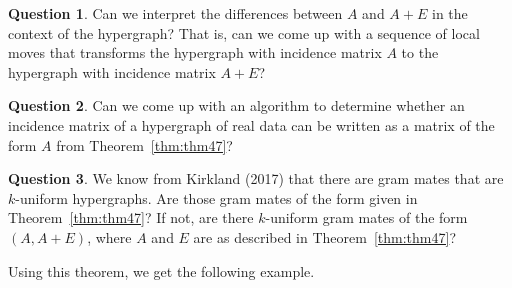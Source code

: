 \documentclass[11pt]{article}
\theoremstyle{definition}
\newtheorem{question}{Question}
\theoremstyle{remark}
\begin{document}
\begin{question}
Can we interpret the differences between $A$ and $A+E$ in the context of the hypergraph? That is, can we come up with a sequence of local moves that transforms the hypergraph with incidence matrix $A$ to the hypergraph with incidence matrix $A+E$?
\end{question} 

\begin{question}
Can we come up with an algorithm to determine whether an incidence matrix of a hypergraph of real data can be written as a matrix of the form $A$ from Theorem~\ref{thm:thm47}? 
\end{question}

\begin{question}
We know from Kirkland (2017) \cite{kirkland2017} that there are gram mates that are $k$-uniform hypergraphs. Are those gram mates of the form given in Theorem~\ref{thm:thm47}? If not, are there $k$-uniform gram mates of the form $(A, A+E)$, where $A$ and $E$ are as described in Theorem~\ref{thm:thm47}?
\end{question} 

Using this theorem, we get the following example. 
\end{document}
